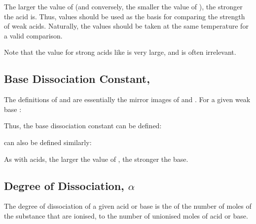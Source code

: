 			\mathdiagram{
				\[ \MpKa = -\lg{\MKa} \]
			}

			The larger the value of \Ka{} (and conversely, the smaller the value of \pKa{}), the stronger the acid is. Thus, \Ka{}
			values should be used as the basis for comparing the strength of weak acids. Naturally, the \Ka{} values should be
			taken at the same temperature for a valid comparison.

			Note that the \Ka{} value for strong acids like  is very large, and is often irrelevant.





		\pagebreak
		\subsection{Base Dissociation Constant, \texorpdfstring{\Kb{}}{Kb}}

			The definitions of \Kb{} and \pKb{} are essentially the mirror images of \Ka{} and \pKa{}. For a given weak base :


			Thus, the base dissociation constant \Kb{} can be defined:

			\mathdiagram{
				\[ \MKa = \frac{[\ch{BH+}][\ch{OH-}]}{[\ch{B}]} \]
			}

			\pKb{} can also be defined similarly:

			\mathdiagram{
				\[ \MpKb = -\lg{\MKb} \]
			}

			As with acids, the larger the value of \Kb{}, the stronger the base.



		\subsection{Degree of Dissociation, \texorpdfstring{$\alpha$}{a}}

			The degree of dissociation of a given acid or base is the  of the number of moles of the substance that are ionised, to
			the number of unionised moles of acid or base.

			\mathdiagram{
				\[ \alpha = \cfrac{[\mathrm{acid}]_{dissoc}}{[\mathrm{acid}]_{initial}} \]
			}

